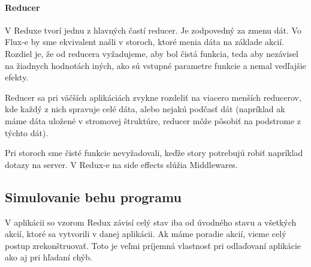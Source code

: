 \paragraph{Reducer}
V Reduxe tvorí jednu z hlavných častí reducer. Je zodpovedný za zmenu dát. Vo Flux-e by sme ekvivalent našli v storoch, ktoré menia dáta na základe akcií. Rozdiel je, že od reducera vyžadujeme, aby bol čistá funkcia, teda aby nezávisel na žiadnych hodnotách iných, ako sú vstupné parametre funkcie a nemal vedľajšie efekty. 

Reducer sa pri väčších aplikáciách zvykne rozdeliť na viacero menších reducerov, kde každý z nich spravuje celé dáta, alebo nejakú podčasť dát (napríklad ak máme dáta uložené v stromovej štruktúre, reducer môže pôsobiť na podstrome z týchto dát).

Pri storoch sme čisté funkcie nevyžadovali, keďže story potrebujú robiť napríklad dotazy na server. V Redux-e na side effects slúžia Middlewares.

\subsection{Simulovanie behu programu}
V aplikácii so vzorom Redux závisí celý stav iba od úvodného stavu a všetkých akcií, ktoré sa vytvorili v danej aplikácii. Ak máme poradie akcií, vieme celý postup zrekonštruovať. Toto je veľmi príjemná vlastnosť pri odlaďovaní aplikácie ako aj pri hľadaní chýb.
